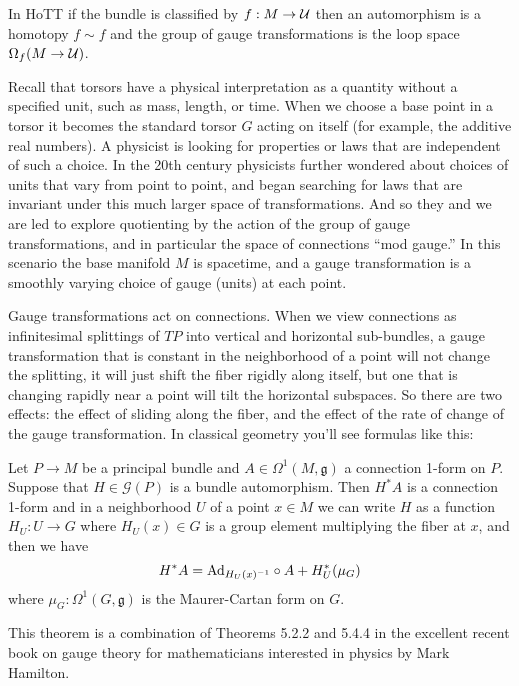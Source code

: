 In HoTT if the bundle is classified by \( f:M\to \mathcal{U} \) then an automorphism is a homotopy \( f\sim f \) and the group of gauge transformations is the loop space \( \Omega_f(M\to \mathcal{U}) \). 

Recall that torsors have a physical interpretation as a quantity without a specified unit, such as mass, length, or time. When we choose a base point in a torsor it becomes the standard torsor \( G \) acting on itself (for example, the additive real numbers). A physicist is looking for properties or laws that are independent of such a choice. In the 20th century physicists further wondered about choices of units that vary from point to point, and began searching for laws that are invariant under this much larger space of transformations. And so they and we are led to explore quotienting by the action of the group of gauge transformations, and in particular the space of connections ``mod gauge.'' In this scenario the base manifold \( M \) is spacetime, and a gauge transformation is a smoothly varying choice of gauge (units) at each point.

Gauge transformations act on connections. When we view connections as infinitesimal splittings of \( TP \) into vertical and horizontal sub-bundles, a gauge transformation that is constant in the neighborhood of a point will not change the splitting, it will just shift the fiber rigidly along itself, but one that is changing rapidly near a point will tilt the horizontal subspaces. So there are two effects: the effect of sliding along the fiber, and the effect of the rate of change of the gauge transformation. In classical geometry you'll see formulas like this:

\begin{mythm}
Let \( P\to M \) be a principal bundle and \( A\in\Omega^1(M,\mathfrak{g}) \) a connection 1-form on \( P \). Suppose that \( H\in \mathscr{G}(P) \) is a bundle automorphism. Then \( H^*A \) is a connection 1-form and in a neighborhood \( U \) of a point \( x\in M \) we can write \( H \) as a function \( H_U:U\to G \) where \( H_U(x)\in G \) is a group element multiplying the fiber at \( x \), and then we have
\[ 
H^*A=\mathrm{Ad}_{H_U(x)^{-1}}\circ A + H_U^*(\mu_G)
\] where \( \mu_G:\Omega^1(G,\mathfrak{g}) \) is the Maurer-Cartan form on \( G \).
\end{mythm}

This theorem is a combination of Theorems 5.2.2 and 5.4.4 in the excellent recent book on gauge theory for mathematicians interested in physics by Mark Hamilton\cite{hamilton2017}.

